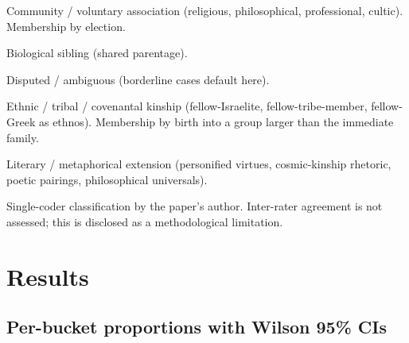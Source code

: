 \documentclass[11pt,oneside]{article}
\begin{document}
\begin{description}[leftmargin=2em]
\item[\textbf{A}] Community / voluntary association (religious,
  philosophical, professional, cultic).  Membership by election.
\item[\textbf{B}] Biological sibling (shared parentage).
\item[\textbf{C}] Disputed / ambiguous (borderline cases default here).
\item[\textbf{D}] Ethnic / tribal / covenantal kinship (fellow-Israelite,
  fellow-tribe-member, fellow-Greek as ethnos).  Membership by birth
  into a group larger than the immediate family.
\item[\textbf{E}] Literary / metaphorical extension (personified virtues,
  cosmic-kinship rhetoric, poetic pairings, philosophical universals).
\end{description}

Single-coder classification by the paper's author.  Inter-rater
agreement is not assessed; this is disclosed as a methodological
limitation.

\section*{Results}

\subsection*{Per-bucket proportions with Wilson 95\% CIs}
\end{document}

